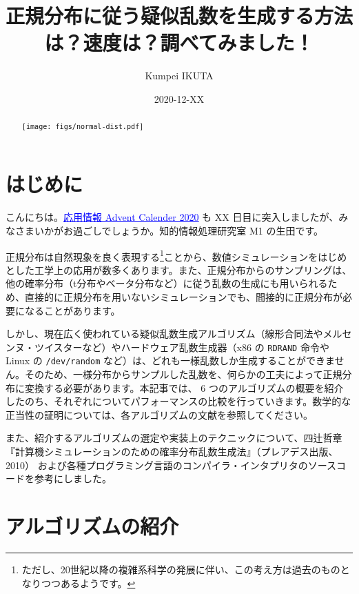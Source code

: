 \documentclass[twocolumn, dvipdfmx]{jsarticle}
\begin{document}
\title{正規分布に従う疑似乱数を生成する方法は？速度は？調べてみました！}
\author{Kumpei IKUTA}
\date{2020-12-XX}

\renewcommand{\abstractname}{}
\begin{abstract}
\centering
\texttt{[image: figs/normal-dist.pdf]}
\end{abstract}

\maketitle

\section*{はじめに}

こんにちは。\href{https://adventar.org/calendars/5671}{\textcolor{blue}{\underline{応用情報 Advent Calender 2020}}} も XX 日目に突入しましたが、みなさまいかがお過ごしでしょうか。知的情報処理研究室 M1 の生田です。

正規分布は自然現象を良く表現する\footnote{ただし、20世紀以降の複雑系科学の発展に伴い、この考え方は過去のものとなりつつあるようです。}ことから、数値シミュレーションをはじめとした工学上の応用が数多くあります。また、正規分布からのサンプリングは、他の確率分布（t分布やベータ分布など）に従う乱数の生成にも用いられるため、直接的に正規分布を用いないシミュレーションでも、間接的に正規分布が必要になることがあります。

しかし、現在広く使われている疑似乱数生成アルゴリズム（線形合同法やメルセンヌ・ツイスターなど）やハードウェア乱数生成器（x86 の \texttt{RDRAND} 命令や Linux の \texttt{/dev/random} など）は、どれも一様乱数しか生成することができません。そのため、一様分布からサンプルした乱数を、何らかの工夫によって正規分布に変換する必要があります。本記事では、 6 つのアルゴリズムの概要を紹介したのち、それぞれについてパフォーマンスの比較を行っていきます。数学的な正当性の証明については、各アルゴリズムの文献を参照してください。

また、紹介するアルゴリズムの選定や実装上のテクニックについて、四辻哲章『計算機シミュレーションのための確率分布乱数生成法』（プレアデス出版、2010）\cite{yotsuji2010} および各種プログラミング言語のコンパイラ・インタプリタのソースコードを参考にしました。

\section*{アルゴリズムの紹介}
\end{document}
